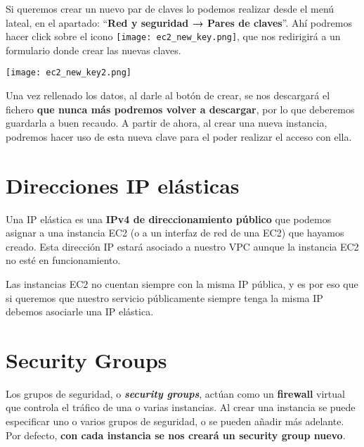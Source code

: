 Si queremos crear un nuevo par de claves lo podemos realizar desde el menú lateal, en el apartado: “\textbf{Red y seguridad → Pares de claves}”. Ahí podremos hacer click sobre el icono \texttt{[image: ec2\_new\_key.png]}, que nos redirigirá a un formulario donde crear las nuevas claves.

\begin{center}
	\texttt{[image: ec2\_new\_key2.png]}
\end{center}

Una vez rellenado los datos, al darle al botón de crear, se nos descargará el fichero \textbf{que nunca más podremos volver a descargar}, por lo que deberemos guardarla a buen recaudo. A partir de ahora, al crear una nueva instancia, podremos hacer uso de esta nueva clave para el poder realizar el acceso con ella.



\chapter{Direcciones IP elásticas}

Una IP elástica es una \textbf{IPv4 de direccionamiento público} que podemos asignar a una instancia EC2 (o a un interfaz de red de una EC2) que hayamos creado. Esta dirección IP estará asociado a nuestro VPC aunque la instancia EC2 no esté en funcionamiento.


Las instancias EC2 no cuentan siempre con la misma IP pública, y es por eso que si queremos que nuestro servicio públicamente siempre tenga la misma IP debemos asociarle una IP elástica.


\chapter{Security Groups}

Los grupos de seguridad, o \textbf{\textit{security groups}}, actúan como un \textbf{firewall} virtual que controla el tráfico de una o varias instancias. Al crear una instancia se puede especificar uno o varios grupos de seguridad, o se pueden añadir más adelante. Por defecto, \textbf{con cada instancia se nos creará un security group nuevo}.

